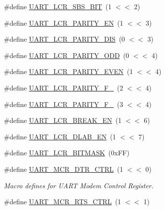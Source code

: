 \begin{DoxyCompactItemize}
\item 
\#define \hyperlink{group___u_a_r_t__18_x_x__43_x_x_ga6d36ad770b49b2354ed5cefbc066b7e2}{U\+A\+R\+T\+\_\+\+L\+C\+R\+\_\+\+S\+B\+S\+\_\+B\+IT}~(1 $<$$<$ 2)
\item 
\#define \hyperlink{group___u_a_r_t__18_x_x__43_x_x_ga4fba4b3d639bdfa713d12466d411f57c}{U\+A\+R\+T\+\_\+\+L\+C\+R\+\_\+\+P\+A\+R\+I\+T\+Y\+\_\+\+EN}~(1 $<$$<$ 3)
\item 
\#define \hyperlink{group___u_a_r_t__18_x_x__43_x_x_ga91bc2978f5af5ac9a1f18af284275b39}{U\+A\+R\+T\+\_\+\+L\+C\+R\+\_\+\+P\+A\+R\+I\+T\+Y\+\_\+\+D\+IS}~(0 $<$$<$ 3)
\item 
\#define \hyperlink{group___u_a_r_t__18_x_x__43_x_x_ga5ef9bdb85d3f5c3823d667190b19bb40}{U\+A\+R\+T\+\_\+\+L\+C\+R\+\_\+\+P\+A\+R\+I\+T\+Y\+\_\+\+O\+DD}~(0 $<$$<$ 4)
\item 
\#define \hyperlink{group___u_a_r_t__18_x_x__43_x_x_ga48df31af63d9e3a65b13a32880bb0b36}{U\+A\+R\+T\+\_\+\+L\+C\+R\+\_\+\+P\+A\+R\+I\+T\+Y\+\_\+\+E\+V\+EN}~(1 $<$$<$ 4)
\item 
\#define \hyperlink{group___u_a_r_t__18_x_x__43_x_x_ga17566959150e60563687a91817ddf844}{U\+A\+R\+T\+\_\+\+L\+C\+R\+\_\+\+P\+A\+R\+I\+T\+Y\+\_\+\+F\+\_}~(2 $<$$<$ 4)
\item 
\#define \hyperlink{group___u_a_r_t__18_x_x__43_x_x_gaa5d9db8e53dae40ddaa70204fa1b60a3}{U\+A\+R\+T\+\_\+\+L\+C\+R\+\_\+\+P\+A\+R\+I\+T\+Y\+\_\+\+F\+\_}~(3 $<$$<$ 4)
\item 
\#define \hyperlink{group___u_a_r_t__18_x_x__43_x_x_ga2f83aa82aecd63cf457ea423be643d57}{U\+A\+R\+T\+\_\+\+L\+C\+R\+\_\+\+B\+R\+E\+A\+K\+\_\+\+EN}~(1 $<$$<$ 6)
\item 
\#define \hyperlink{group___u_a_r_t__18_x_x__43_x_x_gaae9c53e30321d4cac13137c66b022e9e}{U\+A\+R\+T\+\_\+\+L\+C\+R\+\_\+\+D\+L\+A\+B\+\_\+\+EN}~(1 $<$$<$ 7)
\item 
\#define \hyperlink{group___u_a_r_t__18_x_x__43_x_x_ga28e31fe85eeeb124ff6a471978155356}{U\+A\+R\+T\+\_\+\+L\+C\+R\+\_\+\+B\+I\+T\+M\+A\+SK}~(0x\+F\+F)
\item 
\#define \hyperlink{group___u_a_r_t__18_x_x__43_x_x_ga9fdc7f45b2fb3679b64164b34afb9350}{U\+A\+R\+T\+\_\+\+M\+C\+R\+\_\+\+D\+T\+R\+\_\+\+C\+T\+RL}~(1 $<$$<$ 0)
\begin{DoxyCompactList}\small\item\em Macro defines for U\+A\+RT Modem Control Register. \end{DoxyCompactList}\item 
\#define \hyperlink{group___u_a_r_t__18_x_x__43_x_x_gabf6b55840dea19f6dbc8c8c7077796b3}{U\+A\+R\+T\+\_\+\+M\+C\+R\+\_\+\+R\+T\+S\+\_\+\+C\+T\+RL}~(1 $<$$<$ 1)
$$
\end{DoxyCompactItemize}
